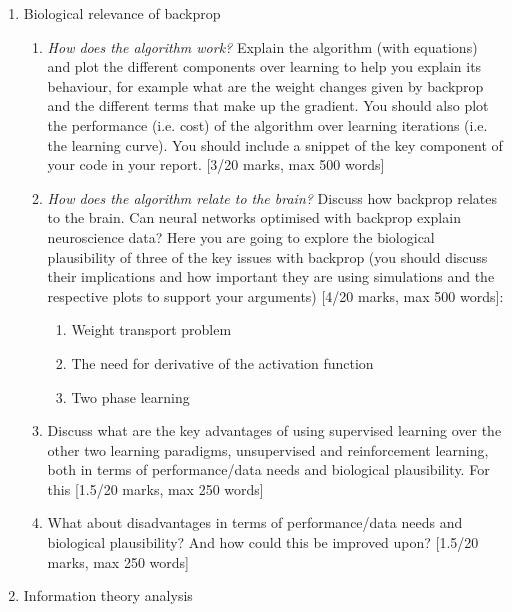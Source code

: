 \documentclass[12pt]{article}
\begin{document}
 \begin{enumerate}

 \item Biological relevance of backprop 

\begin{enumerate}
   
    \item \textsl{How does the algorithm work?} Explain the algorithm (with
      equations) and plot the different components over learning to
      help you explain its behaviour, for example what are the weight changes
      given by backprop and the different terms that make up the
      gradient. You should also plot the performance (i.e. cost) of
      the algorithm over learning iterations (i.e. the learning
      curve). You should include a snippet of the key component of
      your code in your report. [3/20 marks, max 500 words]

 \item \textsl{How does the algorithm relate to the brain?} Discuss how backprop
 relates to the brain. Can neural networks optimised with backprop
 explain neuroscience data? Here you are going to explore the
 biological plausibility of three of the key issues with backprop (you
 should discuss their implications and how important they are using
 simulations and the respective plots to support your arguments) [4/20
   marks, max 500 words]:
\begin{enumerate}
    \item Weight transport problem 
    \item The need for derivative of the activation function
    \item Two phase learning 
\end{enumerate}
 
\item Discuss what are the key advantages of using supervised learning over the other two learning paradigms, unsupervised and reinforcement learning, both in terms of performance/data needs and biological plausibility. For this  [1.5/20 marks, max 250 words] 

\item What about disadvantages in terms of performance/data needs and biological plausibility? And how could this be improved upon? [1.5/20 marks, max 250 words] 
\end{enumerate}
 
\item Information theory analysis 


\end{enumerate}
\end{document}

